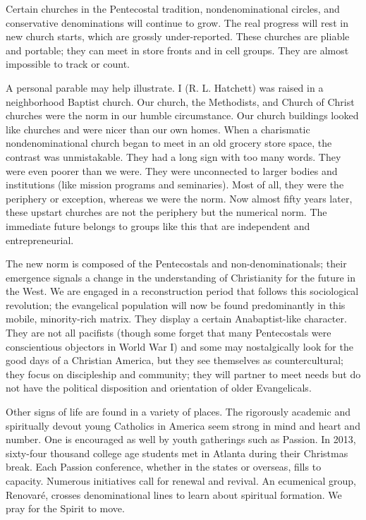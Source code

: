 Certain churches in the Pentecostal tradition, nondenominational circles, and conservative
denominations will continue to grow. The real progress will rest in new church starts, which are
grossly under-reported. These churches are pliable and portable; they can meet in store fronts and
in cell groups. They are almost impossible to track or count.

A personal parable may help illustrate. I (R. L. Hatchett) was raised in a neighborhood Baptist
church. Our church, the Methodists, and Church of Christ churches were the norm in our humble
circumstance. Our church buildings looked like churches and were nicer than our own homes. When a
charismatic nondenominational church began to meet in an old grocery store space, the contrast was
unmistakable. They had a long sign with too many words. They were even poorer than we were. They
were unconnected to larger bodies and institutions (like mission programs and seminaries). Most of
all, they were the periphery or exception, whereas we were the norm. Now almost fifty years later,
these upstart churches are not the periphery but the numerical norm. The immediate future belongs to
groups like this that are independent and entrepreneurial.

The new norm is composed of the Pentecostals and non-denominationals; their emergence signals a
change in the understanding of Christianity for the future in the West. We are engaged in a
reconstruction period that follows this sociological revolution; the evangelical population will now
be found predominantly in this mobile, minority-rich matrix. They display a certain Anabaptist-like
character. They are not all pacifists (though some forget that many Pentecostals were conscientious
objectors in World War I) and some may nostalgically look for the good days of a Christian America,
but they see themselves as countercultural; they focus on discipleship and community; they will
partner to meet needs but do not have the political disposition and orientation of older
Evangelicals.

Other signs of life are found in a variety of places. The rigorously academic and spiritually devout
young Catholics in America seem strong in mind and heart and number. One is encouraged as well by
youth gatherings such as Passion. In 2013, sixty-four thousand college age students met in Atlanta
during their Christmas break. Each Passion conference, whether in the states or overseas, fills to
capacity. Numerous initiatives call for renewal and revival. An ecumenical group, Renovaré, crosses
denominational lines to learn about spiritual formation. We pray for the Spirit to move.


